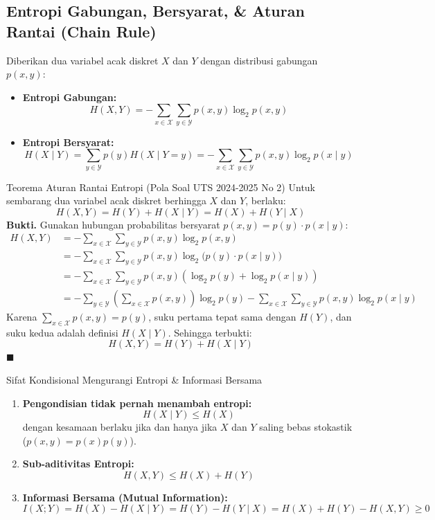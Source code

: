 \documentclass[11pt,a4paper]{article}
\newenvironment{proof}{\noindent\textbf{Bukti.}}{\hfill$\blacksquare$\vspace{0.3em}}
\begin{document}
\subsection{Entropi Gabungan, Bersyarat, \& Aturan Rantai (Chain Rule)}
Diberikan dua variabel acak diskret $X$ dan $Y$ dengan distribusi gabungan $p(x, y)$:
\begin{itemize}[leftmargin=*]
    \item \textbf{Entropi Gabungan:}
    \[
    H(X, Y) = -\sum_{x \in \mathcal{X}} \sum_{y \in \mathcal{Y}} p(x, y) \log_2 p(x, y)
    \]
    \item \textbf{Entropi Bersyarat:}
    \[
    H(X \mid Y) = \sum_{y \in \mathcal{Y}} p(y) H(X \mid Y = y) = -\sum_{x \in \mathcal{X}} \sum_{y \in \mathcal{Y}} p(x, y) \log_2 p(x \mid y)
    \]
\end{itemize}

\begin{thmbox}{Teorema Aturan Rantai Entropi (Pola Soal UTS 2024-2025 No 2)}
Untuk sembarang dua variabel acak diskret berhingga $X$ dan $Y$, berlaku:
\[
H(X, Y) = H(Y) + H(X \mid Y) = H(X) + H(Y \mid X)
\]
\begin{proof}
Gunakan hubungan probabilitas bersyarat $p(x, y) = p(y) \cdot p(x \mid y)$:
\begin{align*}
H(X, Y) &= -\sum_{x \in \mathcal{X}} \sum_{y \in \mathcal{Y}} p(x, y) \log_2 p(x, y) \\
&= -\sum_{x \in \mathcal{X}} \sum_{y \in \mathcal{Y}} p(x, y) \log_2 \big(p(y) \cdot p(x \mid y)\big) \\
&= -\sum_{x \in \mathcal{X}} \sum_{y \in \mathcal{Y}} p(x, y) \left(\log_2 p(y) + \log_2 p(x \mid y)\right) \\
&= -\sum_{y \in \mathcal{Y}} \left(\sum_{x \in \mathcal{X}} p(x, y)\right) \log_2 p(y) - \sum_{x \in \mathcal{X}} \sum_{y \in \mathcal{Y}} p(x, y) \log_2 p(x \mid y)
\end{align*}
Karena $\sum_{x \in \mathcal{X}} p(x, y) = p(y)$, suku pertama tepat sama dengan $H(Y)$, dan suku kedua adalah definisi $H(X \mid Y)$. Sehingga terbukti:
\[
H(X, Y) = H(Y) + H(X \mid Y)
\]
\end{proof}
\end{thmbox}

\begin{thmbox}{Sifat Kondisional Mengurangi Entropi \& Informasi Bersama}
\begin{enumerate}[leftmargin=*]
    \item \textbf{Pengondisian tidak pernah menambah entropi:}
    \[
    H(X \mid Y) \le H(X)
    \]
    dengan kesamaan berlaku jika dan hanya jika $X$ dan $Y$ saling bebas stokastik ($p(x, y) = p(x)p(y)$).
    \item \textbf{Sub-aditivitas Entropi:}
    \[
    H(X, Y) \le H(X) + H(Y)
    \]
    \item \textbf{Informasi Bersama (Mutual Information):}
    \[
    I(X; Y) = H(X) - H(X \mid Y) = H(Y) - H(Y \mid X) = H(X) + H(Y) - H(X, Y) \ge 0
    \]
\end{enumerate}
\end{thmbox}
\end{document}
